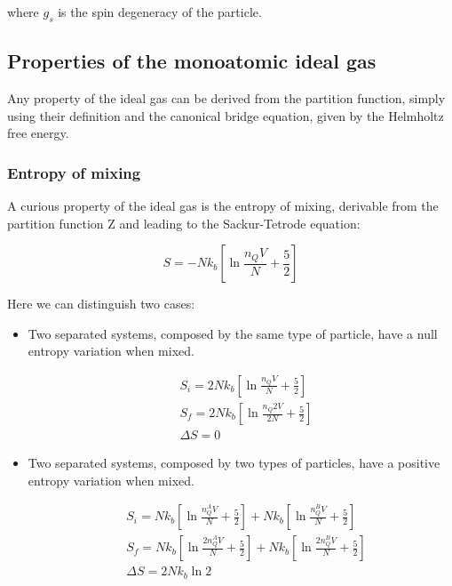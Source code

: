 \documentclass{article}
\begin{document}
where $g_s$ is the spin degeneracy of the particle.


\subsection{Properties of the monoatomic ideal gas}

Any property of the ideal gas can be derived from the partition function,
simply using their definition and the canonical bridge equation, given by the Helmholtz free energy.

\subsubsection{Entropy of mixing}

A curious property of the ideal gas is the entropy of mixing, derivable from the partition function Z and
leading to the Sackur-Tetrode equation:

\begin{equation}
    S=-Nk_b\left[\ln{\frac{n_QV}{N}}+\frac{5}{2}\right]
\end{equation}

Here we can distinguish two cases:

\begin{itemize}
    \item Two separated systems, composed by the same type of particle, have a null entropy variation when mixed.

          \begin{equation}
              \begin{aligned}
                   & S_i=2Nk_b\left[\ln{\frac{n_QV}{N}}+\frac{5}{2}\right]   \\
                   & S_f=2Nk_b\left[\ln{\frac{n_Q2V}{2N}}+\frac{5}{2}\right] \\
                   & \Delta S=0
              \end{aligned}
          \end{equation}

    \item Two separated systems, composed by two types of particles, have a positive entropy variation when mixed.

          \begin{equation}
              \begin{aligned}
                   & S_i=Nk_b\left[\ln{\frac{n_Q^AV}{N}}+\frac{5}{2}\right]+Nk_b\left[\ln{\frac{n_Q^BV}{N}}+\frac{5}{2}\right]    \\
                   & S_f= Nk_b\left[\ln{\frac{2n_Q^AV}{N}}+\frac{5}{2}\right]+Nk_b\left[\ln{\frac{2n_Q^BV}{N}}+\frac{5}{2}\right] \\
                   & \Delta S=2Nk_b\ln{2}
              \end{aligned}
          \end{equation}
\end{itemize}
\end{document}
